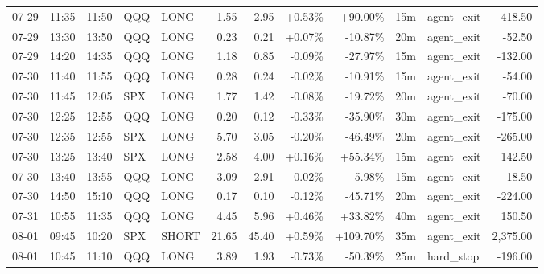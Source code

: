 \documentclass[11pt,a4paper]{article}
\begin{document}
\begin{center}
\begin{longtable}{>{\color{txtmain}}l l l l l r r r r r >{\color{txtmain}}l r}
07-29 & 11:35 & 11:50 & QQQ & LONG & 1.55 & 2.95 & \textcolor{wingreen}{+0.53\%} & \textcolor{wingreen}{+90.00\%} & 15m & agent\_exit & \textcolor{wingreen}{418.50} \\
07-29 & 13:30 & 13:50 & QQQ & LONG & 0.23 & 0.21 & \textcolor{wingreen}{+0.07\%} & \textcolor{lossred}{-10.87\%} & 20m & agent\_exit & \textcolor{lossred}{-52.50} \\
07-29 & 14:20 & 14:35 & QQQ & LONG & 1.18 & 0.85 & \textcolor{lossred}{-0.09\%} & \textcolor{lossred}{-27.97\%} & 15m & agent\_exit & \textcolor{lossred}{-132.00} \\
07-30 & 11:40 & 11:55 & QQQ & LONG & 0.28 & 0.24 & \textcolor{lossred}{-0.02\%} & \textcolor{lossred}{-10.91\%} & 15m & agent\_exit & \textcolor{lossred}{-54.00} \\
07-30 & 11:45 & 12:05 & SPX & LONG & 1.77 & 1.42 & \textcolor{lossred}{-0.08\%} & \textcolor{lossred}{-19.72\%} & 20m & agent\_exit & \textcolor{lossred}{-70.00} \\
07-30 & 12:25 & 12:55 & QQQ & LONG & 0.20 & 0.12 & \textcolor{lossred}{-0.33\%} & \textcolor{lossred}{-35.90\%} & 30m & agent\_exit & \textcolor{lossred}{-175.00} \\
07-30 & 12:35 & 12:55 & SPX & LONG & 5.70 & 3.05 & \textcolor{lossred}{-0.20\%} & \textcolor{lossred}{-46.49\%} & 20m & agent\_exit & \textcolor{lossred}{-265.00} \\
07-30 & 13:25 & 13:40 & SPX & LONG & 2.58 & 4.00 & \textcolor{wingreen}{+0.16\%} & \textcolor{wingreen}{+55.34\%} & 15m & agent\_exit & \textcolor{wingreen}{142.50} \\
07-30 & 13:40 & 13:55 & QQQ & LONG & 3.09 & 2.91 & \textcolor{lossred}{-0.02\%} & \textcolor{lossred}{-5.98\%} & 15m & agent\_exit & \textcolor{lossred}{-18.50} \\
07-30 & 14:50 & 15:10 & QQQ & LONG & 0.17 & 0.10 & \textcolor{lossred}{-0.12\%} & \textcolor{lossred}{-45.71\%} & 20m & agent\_exit & \textcolor{lossred}{-224.00} \\
07-31 & 10:55 & 11:35 & QQQ & LONG & 4.45 & 5.96 & \textcolor{wingreen}{+0.46\%} & \textcolor{wingreen}{+33.82\%} & 40m & agent\_exit & \textcolor{wingreen}{150.50} \\
08-01 & 09:45 & 10:20 & SPX & SHORT & 21.65 & 45.40 & \textcolor{wingreen}{+0.59\%} & \textcolor{wingreen}{+109.70\%} & 35m & agent\_exit & \textcolor{wingreen}{2,375.00} \\
08-01 & 10:45 & 11:10 & QQQ & LONG & 3.89 & 1.93 & \textcolor{lossred}{-0.73\%} & \textcolor{lossred}{-50.39\%} & 25m & hard\_stop & \textcolor{lossred}{-196.00} \\

\end{longtable}
\end{center}
\end{document}

